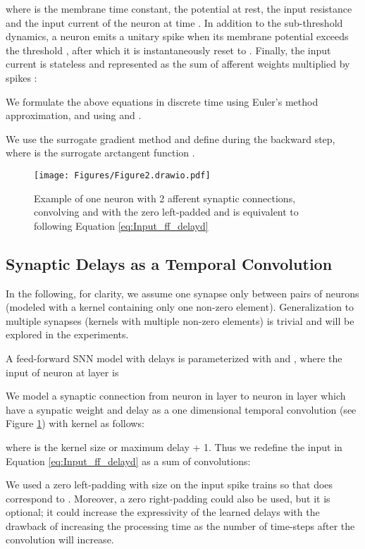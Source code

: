 \documentclass{article} \usepackage{iclr2024_conference,times}
\begin{document}
where  is the membrane time constant,  the potential at rest,  the input resistance and  the input current of the neuron at time . In addition to the sub-threshold dynamics, a neuron emits a unitary spike  when its membrane potential exceeds the threshold , after which it is instantaneously reset to . Finally, the input current  is stateless and represented as the sum of afferent weights  multiplied by spikes :



We formulate the above equations in discrete time using Euler's method approximation, and using  and .



We use the surrogate gradient method \citep{neftci2018surrogate} and define  during the backward step, where  is the surrogate arctangent function \citep{plif}.
\begin{figure}[!ht]
    \centering
        \texttt{[image: Figures/Figure2.drawio.pdf]}
    \caption{Example of one neuron with 2 afferent synaptic connections, convolving  and  with the zero left-padded  and  is equivalent to following Equation \ref{eq:Input_ff_delayd} }
    
    \label{fig:methods_fig1}
\end{figure}

\subsection{Synaptic Delays as a Temporal Convolution}
\label{methods:conv}
In the following, for clarity, we assume one synapse only between pairs of neurons (modeled with a kernel containing only one non-zero element). Generalization to multiple synapses (kernels with multiple non-zero elements) is trivial and will be explored in the experiments.

A feed-forward SNN model with delays is parameterized with  and , where the input of neuron  at layer  is 


We model a synaptic connection from neuron  in layer  to neuron  in layer  which have a synpatic weight  and delay  as a one dimensional temporal convolution (see Figure \ref{fig:methods_fig1}) with kernel  as follows:






where  is the kernel size or maximum delay + 1. Thus we redefine the input  in Equation \ref{eq:Input_ff_delayd} as a sum of convolutions:


We used a zero left-padding with size  on the input spike trains  so that  does correspond to . Moreover, a zero right-padding could also be used, but it is optional; it could increase the expressivity of the learned delays with the drawback of increasing the processing time as the number of time-steps after the convolution will increase.
\end{document}
